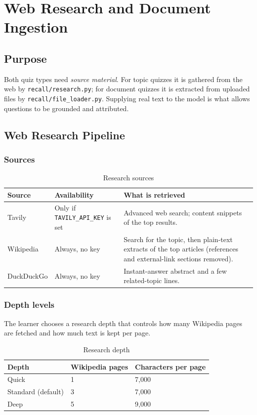 \chapter{Web Research and Document Ingestion}

\section{Purpose}
Both quiz types need \textit{source material}. For topic quizzes it is gathered from the web by \texttt{recall/research.py}; for document quizzes it is extracted from uploaded files by \texttt{recall/file\_loader.py}. Supplying real text to the model is what allows questions to be grounded and attributed.

\section{Web Research Pipeline}
\subsection{Sources}
\begin{table}[H]
\centering
\begin{tabularx}{\textwidth}{@{} p{2.6cm} p{3cm} X @{}}
\toprule
\textbf{Source} & \textbf{Availability} & \textbf{What is retrieved} \\
\midrule
Tavily & Only if \texttt{TAVILY\_API\_KEY} is set & Advanced web search; content snippets of the top results. \\
Wikipedia & Always, no key & Search for the topic, then plain-text extracts of the top articles (references and external-link sections removed). \\
DuckDuckGo & Always, no key & Instant-answer abstract and a few related-topic lines. \\
\bottomrule
\end{tabularx}
\caption{Research sources}
\label{tab:sources}
\end{table}

\subsection{Depth levels}
The learner chooses a research depth that controls how many Wikipedia pages are fetched and how much text is kept per page.
\begin{table}[H]
\centering
\begin{tabularx}{\textwidth}{@{} p{2.5cm} p{3.2cm} X @{}}
\toprule
\textbf{Depth} & \textbf{Wikipedia pages} & \textbf{Characters per page} \\
\midrule
Quick & 1 & 7{,}000 \\
Standard (default) & 3 & 7{,}000 \\
Deep & 5 & 9{,}000 \\
\bottomrule
\end{tabularx}
\caption{Research depth}
\label{tab:depth}
\end{table}

